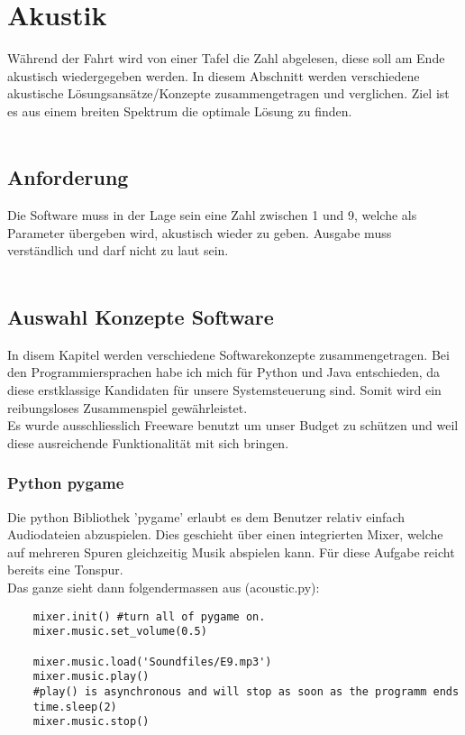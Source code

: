 \documentclass[../../main.tex]{subfiles}
\begin{document}
    \section{Akustik}
    Während der Fahrt wird von einer Tafel die Zahl abgelesen, diese soll am Ende akustisch wiedergegeben werden.
    In diesem Abschnitt werden verschiedene akustische Lösungsansätze/Konzepte zusammengetragen und verglichen.
    Ziel ist es aus einem breiten Spektrum die optimale Lösung zu finden.\\
    \\

    \subsection{Anforderung}
    Die Software muss in der Lage sein eine Zahl zwischen 1 und 9, welche als Parameter übergeben wird, akustisch wieder zu geben.
    Ausgabe muss verständlich und darf nicht zu laut sein.\\
    \\

    \subsection{Auswahl Konzepte Software}
    In disem Kapitel werden verschiedene Softwarekonzepte zusammengetragen. Bei den Programmiersprachen habe ich mich für Python
    und Java entschieden, da diese erstklassige Kandidaten für unsere Systemsteuerung sind.
    Somit wird ein reibungsloses Zusammenspiel gewährleistet.\\

    Es wurde ausschliesslich Freeware benutzt um unser Budget zu schützen und weil diese ausreichende Funktionalität mit sich bringen.

    \subsubsection{Python pygame}
    Die python Bibliothek 'pygame' erlaubt es dem Benutzer relativ einfach Audiodateien abzuspielen.
    Dies geschieht über einen integrierten Mixer, welche auf mehreren Spuren gleichzeitig Musik abspielen kann.
    Für diese Aufgabe reicht bereits eine Tonspur.\\

    Das ganze sieht dann folgendermassen aus (acoustic.py):
    \begin{lstlisting}
    mixer.init() #turn all of pygame on.
    mixer.music.set_volume(0.5)

    mixer.music.load('Soundfiles/E9.mp3')
    mixer.music.play()
    #play() is asynchronous and will stop as soon as the programm ends
    time.sleep(2)
    mixer.music.stop()
    \end{lstlisting}
\end{document}
